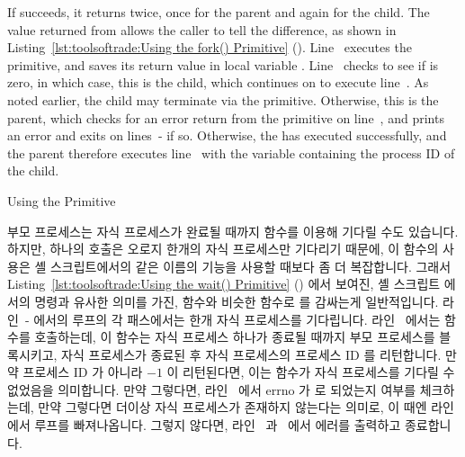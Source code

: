 \begin{lineref}
If  succeeds, it returns twice, once for the parent
and again for the child.
The value returned from  allows the caller to tell
the difference, as shown in
Listing~\ref{lst:toolsoftrade:Using the fork() Primitive}
().
Line~ executes the  primitive, and saves
its return value in local variable .
Line~ checks to see if  is zero, in which case,
this is the child, which continues on to execute line~.
As noted earlier, the child may terminate via the  primitive.
Otherwise, this is the parent, which checks for an error return from
the  primitive on line~, and prints an error
and exits on lines~- if so.
Otherwise, the  has executed successfully, and the parent
therefore executes line~ with the variable 
containing the process ID of the child.
\end{lineref}
\fi

\begin{listing}[tbp]

\caption{Using the  Primitive}
\label{lst:toolsoftrade:Using the wait() Primitive}
\end{listing}

\begin{lineref}
부모 프로세스는 자식 프로세스가 완료될 때까지  함수를 이용해 기다릴
수도 있습니다.
하지만, 하나의  호출은 오로지 한개의 자식 프로세스만 기다리기
때문에, 이 함수의 사용은 셸 스크립트에서의 같은 이름의 기능을 사용할 때보다 좀
더 복잡합니다.
그래서
Listing~\ref{lst:toolsoftrade:Using the wait() Primitive}
()
에서 보여진, 셸 스크립트 에서의  명령과 유사한 의미를 가진,
 함수와 비슷한 함수로  를 감싸는게 일반적입니다.
라인~- 에서의 루프의 각 패스에서는 한개 자식
프로세스를 기다립니다.
라인~ 에서는  함수를 호출하는데, 이 함수는 자식 프로세스
하나가 종료될 때까지 부모 프로세스를 블록시키고, 자식 프로세스가 종료된 후 자식
프로세스의 프로세스 ID 를 리턴합니다.
만약 프로세스 ID 가 아니라 $-1$ 이 리턴된다면, 이는  함수가 자식
프로세스를 기다릴 수 없었음을 의미합니다.
만약 그렇다면, 라인~ 에서 errno 가  로 되었는지 여부를
체크하는데, 만약 그렇다면 더이상 자식 프로세스가 존재하지 않는다는 의미로, 이
때엔 라인~ 에서 루프를 빠져나옵니다.
그렇지 않다면, 라인~ 과~ 에서 에러를 출력하고
종료합니다.
\end{lineref}
\iffalse

